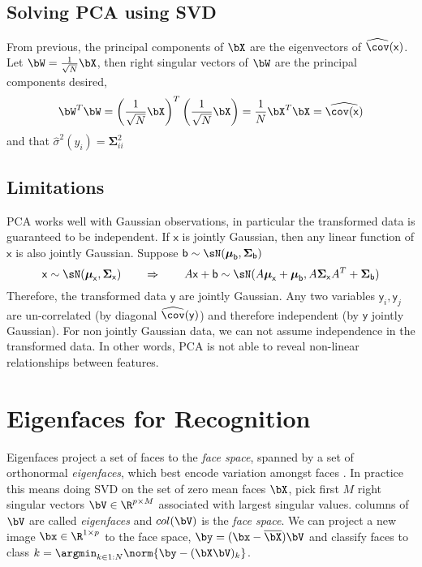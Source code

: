 \documentclass[11pt]{article}
\newcommand\ry{\ensuremath{\mathsf{y}}}
\newcommand\rx{\ensuremath{\mathsf{x}}}
\newcommand\rb{\ensuremath{\mathsf{b}}}
\renewcommand\bmu{\ensuremath{\boldsymbol{\mu}}}
\newcommand\bSigma{\ensuremath{\boldsymbol{\Sigma}}}
\begin{document}
\subsection{Solving PCA using SVD}

From previous, the principal components of $\bX$ are the eigenvectors of $\widehat{\cov}(\rx)$. Let $\bW = \frac{1}{\sqrt{N}} \bX$, then right singular vectors of $\bW$ are the principal components desired,
\[
    \bW^T\bW 
    = \left( \frac{1}{\sqrt{N}} \bX \right)^T \left( \frac{1}{\sqrt{N}} \bX \right)
    = \frac{1}{N} \bX^T\bX
    = \widehat{\cov(\rx)}
\]
and that $\hat{\sigma}^2(y_i) = \boldsymbol{\Sigma}_{ii}^2$


\subsection{Limitations}

PCA works well with Gaussian observations, in particular the transformed data is guaranteed to be independent. If $\rx$ is jointly Gaussian, then any linear function of $\rx$ is also jointly Gaussian. Suppose $\rb \sim \sN(\boldsymbol{\mu}_{\rb},\boldsymbol{\Sigma}_{\rb})$
\[
    \rx \sim \sN(\bmu_{\rx},\bSigma_{\rx})
    \quad\quad \Rightarrow \quad\quad
    A\rx + \rb \sim \sN(A\bmu_{\rx} + \bmu_{\rb}, A\bSigma_{\rx} A^T + \bSigma_{\rb})
\]
Therefore, the transformed data $\ry$ are jointly Gaussian. Any two variables $\ry_i,\ry_j$ are un-correlated (by diagonal $\widehat{\cov}(\ry)$) and therefore independent (by $\ry$ jointly Gaussian). For non jointly Gaussian data, we can not assume independence in the transformed data. In other words, PCA is not able to reveal non-linear relationships between features.



\section{Eigenfaces for Recognition}

Eigenfaces project a set of faces to the \textit{face space}, spanned by a set of orthonormal \textit{eigenfaces}, which best encode variation amongst faces \cite{pentlandFaceRecognitionUsing1991,turkEigenfacesRecognition1991,junzhangFaceRecognitionEigenface1997}. In practice this means doing SVD on the set of zero mean faces $\bX$, pick first $M$ right singular vectors $\bV\in\R^{p\times M}$ associated with largest singular values. columns of $\bV$ are called \textit{eigenfaces} and $col(\bV)$ is the \textit{face space}. We can project a new image $\bx \in \R^{1\times p}$ to the face space, $\by = (\bx-\overline{\bX})\bV$ and classify faces to class $k = \argmin_{k\in 1:N} \norm{ \by - (\bX\bV)_k }$.


\newpage
\printbibliography 
\end{document}
